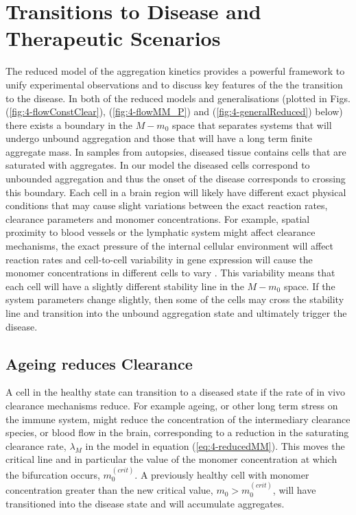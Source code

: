 \section{Transitions to Disease and Therapeutic Scenarios}

The reduced model of the aggregation kinetics provides a powerful framework to unify experimental observations and to discuss key features of the the transition to the disease. In both of the reduced models and generalisations (plotted in Figs. (\ref{fig:4-flowConstClear}), (\ref{fig:4-flowMM_P}) and  (\ref{fig:4-generalReduced}) below) there exists a boundary in the $M-m_0$ space that separates systems that will undergo unbound aggregation and those that will have a long term finite aggregate mass. In samples from autopsies, diseased tissue contains cells that are saturated with aggregates. In our model the diseased cells correspond to unbounded aggregation and thus the onset of the disease corresponds to crossing this boundary.   Each cell in a brain region will likely have different exact physical conditions that may cause slight variations between the exact reaction rates, clearance parameters and monomer concentrations. For example, spatial proximity to blood vessels or the lymphatic system might affect clearance mechanisms, the exact pressure of the internal cellular environment will affect reaction rates and cell-to-cell variability in gene expression will cause the monomer concentrations in different cells to vary . This variability means that each cell will have a slightly different stability line in the $M-m_0$ space. If the system parameters change slightly, then some of the cells may cross the stability line and transition into the unbound aggregation state and ultimately trigger the disease.

\subsection{Ageing reduces Clearance}
\cite{keller_decreased_2000}
A cell in the healthy state can transition to a diseased state if the rate of in vivo clearance mechanisms reduce. For example ageing, or other long term stress on the immune system, might reduce the concentration of the intermediary clearance species, or blood flow in the brain, corresponding to a reduction in the saturating clearance rate, $\lambda_M$ in the model in equation (\ref{eq:4-reducedMM}). This moves the critical line and in particular the value of the monomer concentration at which the bifurcation occurs, $m_0^{(crit)}$. A previously healthy cell with monomer concentration greater than the new critical value, $m_0 > m_0^{(crit)}$, will have transitioned into the disease state and will accumulate aggregates.

